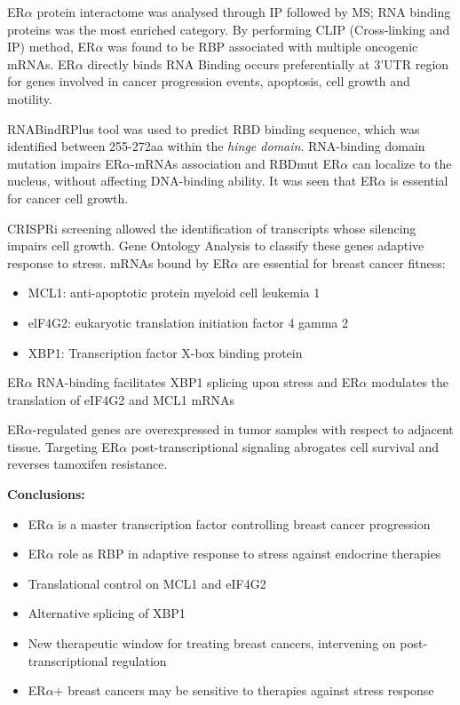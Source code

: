 ER$\alpha$ protein interactome was analysed through IP followed by MS; RNA binding proteins was the most enriched category. By performing CLIP (Cross-linking and IP) method, ER$\alpha$ was found to be RBP associated with multiple oncogenic mRNAs.  ER$\alpha$ directly binds RNA
Binding occurs preferentially at 3’UTR region for genes involved in cancer progression events, apoptosis, cell growth and motility.

RNABindRPlus tool was used to predict RBD binding sequence, which was identified between 255-272aa within the \emph{hinge domain}. RNA-binding domain mutation impairs ER$\alpha$-mRNAs association and RBDmut ER$\alpha$ can localize to the nucleus, without affecting DNA-binding ability. It was seen that ER$\alpha$ is essential for cancer cell growth.

CRISPRi screening allowed the identification of transcripts whose silencing impairs cell growth. Gene Ontology Analysis to classify these genes  adaptive response to stress. 
mRNAs bound by  ER$\alpha$ are essential for breast cancer fitness:
\begin{itemize}
\tightlist
\item MCL1: anti-apoptotic protein myeloid cell leukemia 1
\item elF4G2: eukaryotic translation initiation factor 4 gamma 2
\item XBP1: Transcription factor X-box binding protein
\end{itemize}
ER$\alpha$ RNA-binding facilitates XBP1 splicing upon stress and ER$\alpha$  modulates the translation of eIF4G2 and MCL1 mRNAs

ER$\alpha$-regulated genes are overexpressed in tumor samples with respect to adjacent tissue.
Targeting ER$\alpha$ post-transcriptional signaling abrogates cell survival and reverses tamoxifen resistance.

\textbf{Conclusions:}
\begin{itemize}
\tightlist
\item ER$\alpha$ is a master transcription factor controlling breast cancer progression
\item ER$\alpha$ role as RBP in adaptive response to stress against endocrine therapies 
\item Translational control on MCL1 and eIF4G2
\item Alternative splicing of XBP1
\item New therapeutic window for treating breast cancers, intervening on post-transcriptional regulation
\item ER$\alpha$+ breast cancers may be sensitive to therapies against stress response 
\end{itemize}

